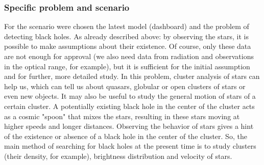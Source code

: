 \documentclass{article}
\begin{document}
\subsubsection {Specific problem and scenario}
For the scenario were chosen the latest model (dashboard) and the problem of detecting black holes. As already described above: by observing the stars, it is possible to make assumptions about their existence. Of course, only these data are not enough for approval (we also need data from radiation and observations in the optical range, for example), but it is sufficient for the initial assumption and for further, more detailed study.
In this problem, cluster analysis of stars can help us, which can tell us about quasars, globular or open clusters of stars or even new objects. It may also be useful to study the general motion of stars of a certain cluster. A potentially existing black hole in the center of the cluster acts as a cosmic "spoon" that mixes the stars, resulting in these stars moving at higher speeds and longer distances. Observing the behavior of stars gives a hint of the existence or absence of a black hole in the center of the cluster. So, the main method of searching for black holes at the present time is to study clusters (their density, for example), brightness distribution and velocity of stars. \\
\end{document}
